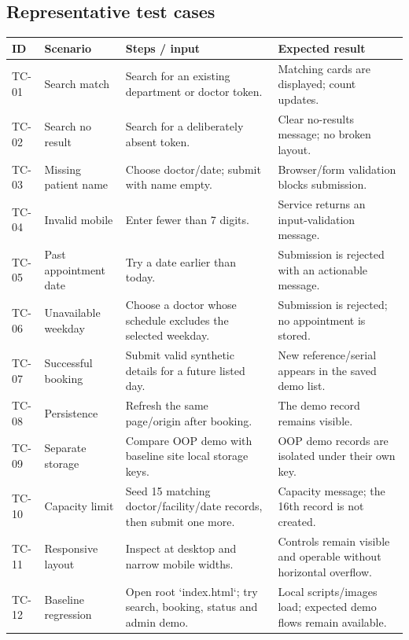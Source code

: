 \documentclass[11pt,a4paper]{article}
\begin{document}
\subsection{Representative test cases}
\small
\begin{longtable}{p{1.15cm}p{3.7cm}p{5.4cm}p{2.9cm}}
\toprule \textbf{ID} & \textbf{Scenario} & \textbf{Steps / input} & \textbf{Expected result}\\\midrule
TC-01 & Search match & Search for an existing department or doctor token. & Matching cards are displayed; count updates.\\
TC-02 & Search no result & Search for a deliberately absent token. & Clear no-results message; no broken layout.\\
TC-03 & Missing patient name & Choose doctor/date; submit with name empty. & Browser/form validation blocks submission.\\
TC-04 & Invalid mobile & Enter fewer than 7 digits. & Service returns an input-validation message.\\
TC-05 & Past appointment date & Try a date earlier than today. & Submission is rejected with an actionable message.\\
TC-06 & Unavailable weekday & Choose a doctor whose schedule excludes the selected weekday. & Submission is rejected; no appointment is stored.\\
TC-07 & Successful booking & Submit valid synthetic details for a future listed day. & New reference/serial appears in the saved demo list.\\
TC-08 & Persistence & Refresh the same page/origin after booking. & The demo record remains visible.\\
TC-09 & Separate storage & Compare OOP demo with baseline site local storage keys. & OOP demo records are isolated under their own key.\\
TC-10 & Capacity limit & Seed 15 matching doctor/facility/date records, then submit one more. & Capacity message; the 16th record is not created.\\
TC-11 & Responsive layout & Inspect at desktop and narrow mobile widths. & Controls remain visible and operable without horizontal overflow.\\
TC-12 & Baseline regression & Open root `index.html`; try search, booking, status and admin demo. & Local scripts/images load; expected demo flows remain available.\\
\bottomrule
\end{longtable}
\normalsize
\end{document}
